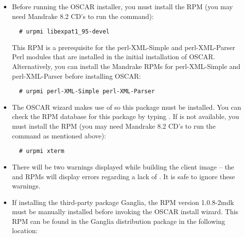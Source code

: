 \begin{itemize}
\item Before running the OSCAR installer, you must install the
   RPM (you may need Mandrake 8.2 CD's to run
  the  command):

\begin{verbatim}
  # urpmi libexpat1_95-devel
\end{verbatim}

  This RPM is a prerequisite for the perl-XML-Simple and
  perl-XML-Parser Perl modules that are installed in the initial
  installation of OSCAR.  Alternatively, you can install the Mandrake
  RPMs for perl-XML-Simple and perl-XML-Parser before installing
  OSCAR:

\begin{verbatim}
  # urpmi perl-XML-Simple perl-XML-Parser
\end{verbatim}


\item The OSCAR wizard makes use of  so this package must be
  installed.  You can check the RPM database for this package by typing
  .  If  is not available, you must
  install the  RPM (you may need Mandrake 8.2
  CD's to run the  command as mentioned above):

\begin{verbatim}
  # urpmi xterm
\end{verbatim}


\item There will be two warnings displayed while building the client
  image -- the  and  RPMs will
  display errors regarding a lack of .  It is safe
  to ignore these warnings.
  
\item If installing the third-party package Ganglia, the
   RPM version 1.0.8-2mdk must be manually installed
  before invoking the OSCAR install wizard.  This RPM can be
  found in the Ganglia distribution package in the following location:\\
  
\end{itemize}

